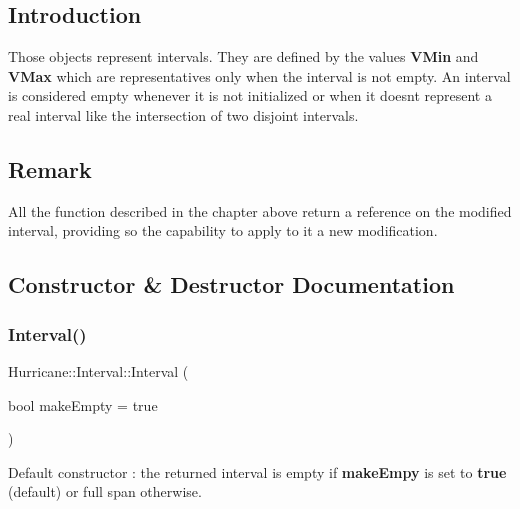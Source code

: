 \hypertarget{classHurricane_1_1Interval_secIntervalIntro}{}\subsection{Introduction}\label{classHurricane_1_1Interval_secIntervalIntro}
Those objects represent intervals. They are defined by the values {\bfseries V\+Min} and {\bfseries V\+Max} which are representatives only when the interval is not empty. An interval is considered empty whenever it is not initialized or when it doesn\textquotesingle{}t represent a real interval like the intersection of two disjoint intervals.\hypertarget{classHurricane_1_1Interval_secIntervalRemark}{}\subsection{Remark}\label{classHurricane_1_1Interval_secIntervalRemark}
All the function described in the chapter above return a reference on the modified interval, providing so the capability to apply to it a new modification. 

\subsection{Constructor \& Destructor Documentation}
\mbox{\label{classHurricane_1_1Interval_a02b04ad7ca380422098992fa8ff5f546}} 
\subsubsection{\texorpdfstring{Interval()}{Interval()}\hspace{0.1cm}{\footnotesize\ttfamily [1/4]}}
{\footnotesize\ttfamily Hurricane\+::\+Interval\+::\+Interval (\begin{DoxyParamCaption}\item[{bool}]{make\+Empty = {\ttfamily true} }\end{DoxyParamCaption})}

Default constructor \+: the returned interval is empty if {\bfseries make\+Empy} is set to {\bfseries true} (default) or full span otherwise. \mbox{\label{classHurricane_1_1Interval_ace4173705b4dbcf6c00cd83bb61c4d43}} 
